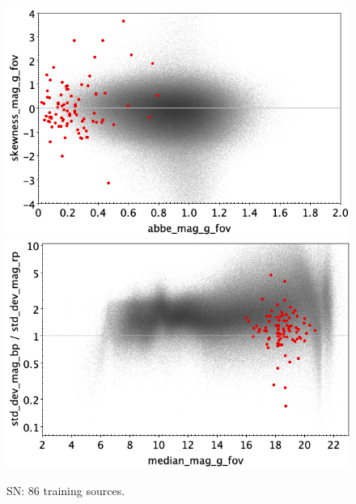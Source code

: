 \documentclass[longauth]{aa}
\begin{document}
\begin{appendix}
\begin{figure}
\vspace{4mm}
 \includegraphics[width=0.45\hsize]{figures/appendix/SN_trn_ask.png}  %
\hspace{2mm}
 \includegraphics[width=0.45\hsize]{figures/appendix/SN_trn_msdr.png}  \\ %
\vspace{4mm}
 \caption{SN: 86 training sources.}  
 \label{fig:app:SN_trn}
\end{figure}


\end{appendix}
\end{document}

